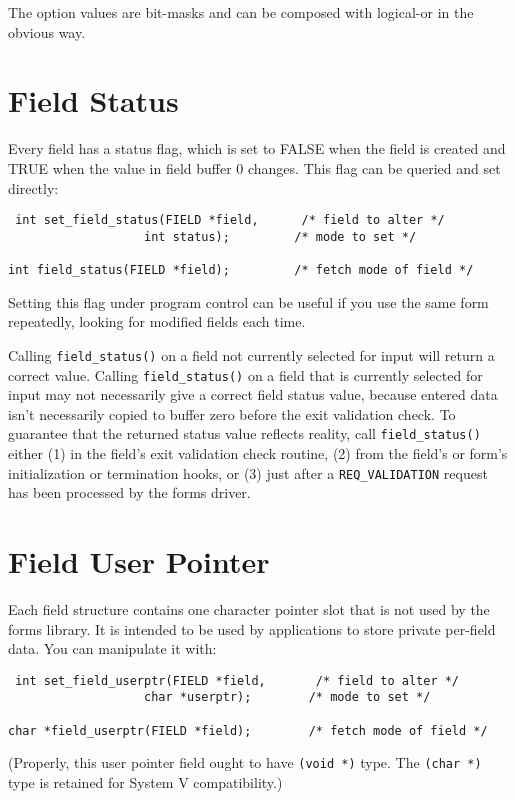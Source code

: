 The option values are bit-masks and can be composed with logical-or in
the obvious way.

\section{Field Status}

\label{f0:fstatus}Every field has a status flag, which is set to FALSE when the field is
created and TRUE when the value in field buffer 0 changes.  This flag can
be queried and set directly:
\begin{verbatim} int set_field_status(FIELD *field,      /* field to alter */
                   int status);         /* mode to set */

int field_status(FIELD *field);         /* fetch mode of field */
\end{verbatim}
Setting this flag under program control can be useful if you use the same
form repeatedly, looking for modified fields each time. 

Calling \texttt{field\_status()} on a field not currently selected
for input will return a correct value.  Calling \texttt{field\_status()} on a
field that is currently selected for input may not necessarily give a
correct field status value, because entered data isn't necessarily copied to
buffer zero before the exit validation check.
To guarantee that the returned status value reflects reality, call
\texttt{field\_status()} either (1) in the field's exit validation check
routine, (2) from the field's or form's initialization or termination
hooks, or (3) just after a \texttt{REQ\_VALIDATION} request has been
processed by the forms driver.

\section{Field User Pointer}

\label{f0:fuser}Each field structure contains one character pointer slot that is not used
by the forms library.  It is intended to be used by applications to store
private per-field data.  You can manipulate it with:
\begin{verbatim} int set_field_userptr(FIELD *field,       /* field to alter */
                   char *userptr);        /* mode to set */

char *field_userptr(FIELD *field);        /* fetch mode of field */
\end{verbatim}
(Properly, this user pointer field ought to have \texttt{(void *)} type.
The \texttt{(char *)} type is retained for System V compatibility.) 

